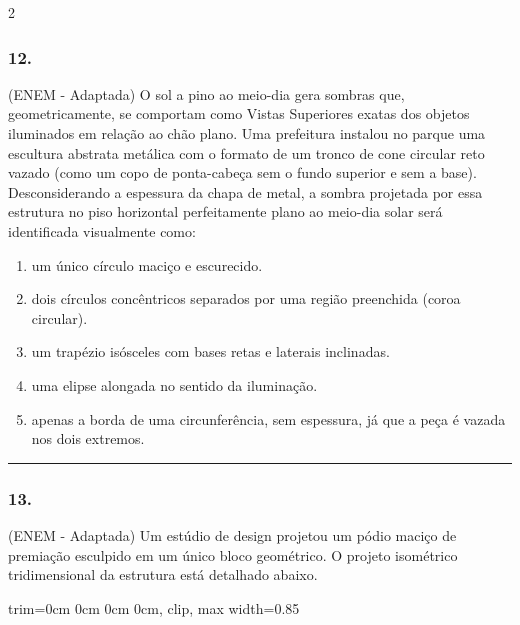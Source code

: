 \documentclass[twoside, 10pt, a4paper]{article}
\newlength{\espacoPreQuestao}\setlength{\espacoPreQuestao}{0.1cm}
\newlength{\espacoQuestao}\setlength{\espacoQuestao}{0.2cm}
\newlength{\espacoAlt}\setlength{\espacoAlt}{0.2cm}
\newcommand{\larguraTikz}{0.85\linewidth}
\begin{document}
\begin{multicols*}{2}
\subsubsection*{12.} (ENEM - Adaptada) O sol a pino ao meio-dia gera sombras que, geometricamente, se comportam como Vistas Superiores exatas dos objetos iluminados em relação ao chão plano. Uma prefeitura instalou no parque uma escultura abstrata metálica com o formato de um tronco de cone circular reto vazado (como um copo de ponta-cabeça sem o fundo superior e sem a base). Desconsiderando a espessura da chapa de metal, a sombra projetada por essa estrutura no piso horizontal perfeitamente plano ao meio-dia solar será identificada visualmente como:
\begin{enumerate}[label=\alph*), itemsep=\espacoAlt]
\item um único círculo maciço e escurecido.
\item dois círculos concêntricos separados por uma região preenchida (coroa circular).
\item um trapézio isósceles com bases retas e laterais inclinadas.
\item uma elipse alongada no sentido da iluminação.
\item apenas a borda de uma circunferência, sem espessura, já que a peça é vazada nos dois extremos.
\end{enumerate}
\par\vspace{\espacoQuestao}

\noindent\textcolor{CorLinha}{\rule{\linewidth}{0.5pt}} 
\par\vspace{\espacoPreQuestao}
\subsubsection*{13.} (ENEM - Adaptada) Um estúdio de design projetou um pódio maciço de premiação esculpido em um único bloco geométrico. O projeto isométrico tridimensional da estrutura está detalhado abaixo.
\begin{center}
\begin{adjustbox}{trim=0cm 0cm 0cm 0cm, clip, max width=\larguraTikz}
\end{adjustbox}
\end{center}
\end{multicols*}
\end{document}
